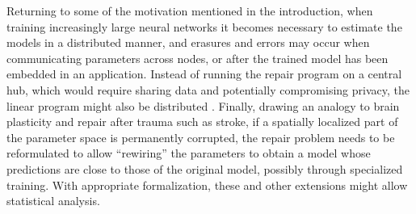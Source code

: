 Returning to some of the motivation mentioned in the introduction, when training increasingly large neural networks
it becomes necessary to estimate the models in a distributed manner, and erasures and errors may occur when
communicating parameters across nodes, or after the trained model has been embedded in an application.
Instead of running the repair program on a central hub,
which would require sharing data and potentially compromising privacy, the linear program
might also be distributed \citep{hong12}. Finally, drawing an analogy to brain plasticity and repair after trauma such as stroke, if a spatially localized part of the parameter space is permanently corrupted, the repair problem needs to be reformulated to allow ``rewiring'' the parameters to obtain a model whose predictions are close to those of the original model, possibly through specialized training. With appropriate formalization, these and other extensions might allow statistical analysis.
